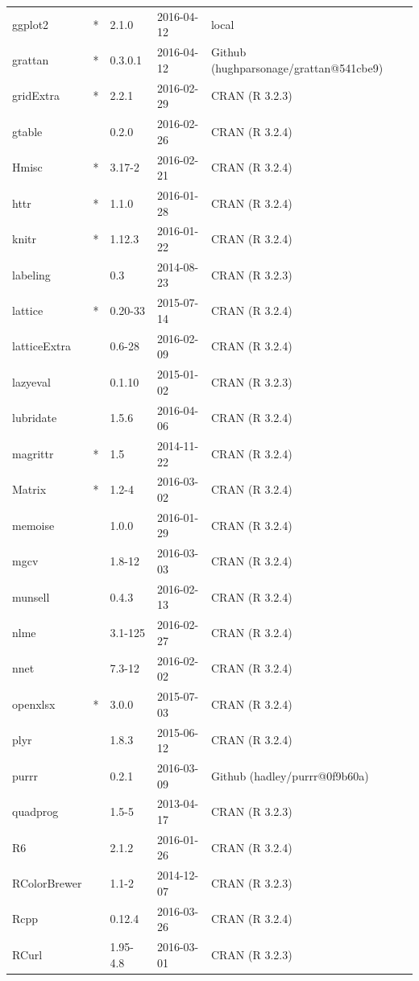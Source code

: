 \documentclass{grattan}\usepackage[]{graphicx}\usepackage[]{color}
\begin{document}
\begin{longtable}{lllll}
  ggplot2 & * & 2.1.0 & 2016-04-12 & local \\ 
  grattan & * & 0.3.0.1 & 2016-04-12 & Github (hughparsonage/grattan@541cbe9) \\ 
  gridExtra & * & 2.2.1 & 2016-02-29 & CRAN (R 3.2.3) \\ 
  gtable &  & 0.2.0 & 2016-02-26 & CRAN (R 3.2.4) \\ 
  Hmisc & * & 3.17-2 & 2016-02-21 & CRAN (R 3.2.4) \\ 
  httr & * & 1.1.0 & 2016-01-28 & CRAN (R 3.2.4) \\ 
  knitr & * & 1.12.3 & 2016-01-22 & CRAN (R 3.2.4) \\ 
  labeling &  & 0.3 & 2014-08-23 & CRAN (R 3.2.3) \\ 
  lattice & * & 0.20-33 & 2015-07-14 & CRAN (R 3.2.4) \\ 
  latticeExtra &  & 0.6-28 & 2016-02-09 & CRAN (R 3.2.4) \\ 
  lazyeval &  & 0.1.10 & 2015-01-02 & CRAN (R 3.2.3) \\ 
  lubridate &  & 1.5.6 & 2016-04-06 & CRAN (R 3.2.4) \\ 
  magrittr & * & 1.5 & 2014-11-22 & CRAN (R 3.2.4) \\ 
  Matrix & * & 1.2-4 & 2016-03-02 & CRAN (R 3.2.4) \\ 
  memoise &  & 1.0.0 & 2016-01-29 & CRAN (R 3.2.4) \\ 
  mgcv &  & 1.8-12 & 2016-03-03 & CRAN (R 3.2.4) \\ 
  munsell &  & 0.4.3 & 2016-02-13 & CRAN (R 3.2.4) \\ 
  nlme &  & 3.1-125 & 2016-02-27 & CRAN (R 3.2.4) \\ 
  nnet &  & 7.3-12 & 2016-02-02 & CRAN (R 3.2.4) \\ 
  openxlsx & * & 3.0.0 & 2015-07-03 & CRAN (R 3.2.4) \\ 
  plyr &  & 1.8.3 & 2015-06-12 & CRAN (R 3.2.4) \\ 
  purrr &  & 0.2.1 & 2016-03-09 & Github (hadley/purrr@0f9b60a) \\ 
  quadprog &  & 1.5-5 & 2013-04-17 & CRAN (R 3.2.3) \\ 
  R6 &  & 2.1.2 & 2016-01-26 & CRAN (R 3.2.4) \\ 
  RColorBrewer &  & 1.1-2 & 2014-12-07 & CRAN (R 3.2.3) \\ 
  Rcpp &  & 0.12.4 & 2016-03-26 & CRAN (R 3.2.4) \\ 
  RCurl &  & 1.95-4.8 & 2016-03-01 & CRAN (R 3.2.3) \\ 

\end{longtable}
\end{document}
